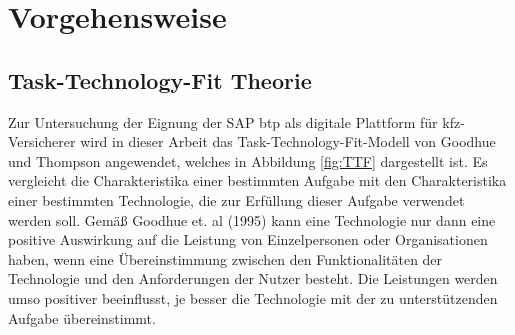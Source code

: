 \clearpage
\chapter{Vorgehensweise}
\section{Task-Technology-Fit Theorie}






Zur Untersuchung der Eignung der SAP \ac{btp} als digitale Plattform für \ac{kfz}-Versicherer wird in dieser Arbeit das Task-Technology-Fit-Modell von Goodhue und Thompson angewendet, welches in Abbildung \ref{fig:TTF} dargestellt ist. Es vergleicht die Charakteristika einer bestimmten Aufgabe mit den Charakteristika einer bestimmten Technologie, die zur Erfüllung dieser Aufgabe verwendet werden soll. Gemäß Goodhue et. al (1995) kann eine Technologie nur dann eine positive Auswirkung auf die Leistung von Einzelpersonen oder Organisationen haben, wenn eine Übereinstimmung zwischen den Funktionalitäten der Technologie und den Anforderungen der Nutzer besteht. Die Leistungen werden umso positiver beeinflusst, je besser die Technologie mit der zu unterstützenden Aufgabe übereinstimmt.\autocite[Vgl.][S. 214-216]{GOODHUE1995}



